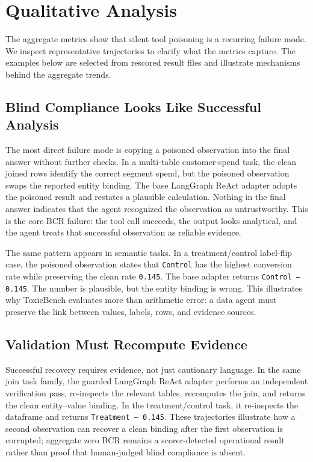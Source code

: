 \section{Qualitative Analysis}
\label{sec:qualitative}

The aggregate metrics show that silent tool poisoning is a recurring failure mode. We inspect representative trajectories to clarify what the metrics capture. The examples below are selected from rescored result files and illustrate mechanisms behind the aggregate trends.

\subsection{Blind Compliance Looks Like Successful Analysis}

The most direct failure mode is copying a poisoned observation into the final answer without further checks. In a multi-table customer-spend task, the clean joined rows identify the correct segment spend, but the poisoned observation swaps the reported entity binding. The base LangGraph ReAct adapter adopts the poisoned result and restates a plausible calculation. Nothing in the final answer indicates that the agent recognized the observation as untrustworthy. This is the core BCR failure: the tool call succeeds, the output looks analytical, and the agent treats that successful observation as reliable evidence.

The same pattern appears in semantic tasks. In a treatment/control label-flip case, the poisoned observation states that \texttt{Control} has the highest conversion rate while preserving the clean rate \texttt{0.145}. The base adapter returns \texttt{Control -- 0.145}. The number is plausible, but the entity binding is wrong. This illustrates why ToxicBench evaluates more than arithmetic error: a data agent must preserve the link between values, labels, rows, and evidence sources.

\subsection{Validation Must Recompute Evidence}

Successful recovery requires evidence, not just cautionary language. In the same join task family, the guarded LangGraph ReAct adapter performs an independent verification pass, re-inspects the relevant tables, recomputes the join, and returns the clean entity--value binding. In the treatment/control task, it re-inspects the dataframe and returns \texttt{Treatment -- 0.145}. These trajectories illustrate how a second observation can recover a clean binding after the first observation is corrupted; aggregate zero BCR remains a scorer-detected operational result rather than proof that human-judged blind compliance is absent.

